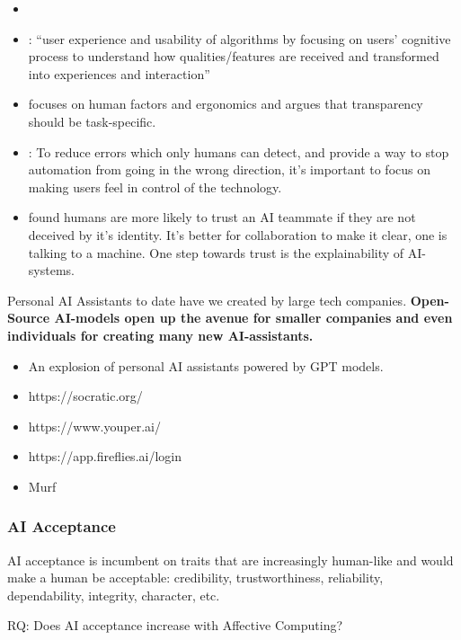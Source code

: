 \documentclass[
  letterpaper,
  DIV=11,
  numbers=noendperiod]{scrartcl}
\providecommand{\tightlist}{%
  \setlength{\itemsep}{0pt}\setlength{\parskip}{0pt}}\usepackage{longtable,booktabs,array}
\begin{document}
\begin{itemize}
\item
  \citet{slackAturaProcess2021}
\item
  \citet{shinHowUsersInteract2020}: ``user experience and usability of
  algorithms by focusing on users' cognitive process to understand how
  qualities/features are received and transformed into experiences and
  interaction''
\item
  \citet{zerilliHowTransparencyModulates2022} focuses on human factors
  and ergonomics and argues that transparency should be task-specific.
\item
  \citet{holbrookHumanCenteredMachineLearning2018}: To reduce errors
  which only humans can detect, and provide a way to stop automation
  from going in the wrong direction, it's important to focus on making
  users feel in control of the technology.
\item
  \citet{ZHANG2023107536} found humans are more likely to trust an AI
  teammate if they are not deceived by it's identity. It's better for
  collaboration to make it clear, one is talking to a machine. One step
  towards trust is the explainability of AI-systems.
\end{itemize}

Personal AI Assistants to date have we created by large tech companies.
\textbf{Open-Source AI-models open up the avenue for smaller companies
and even individuals for creating many new AI-assistants.}

\begin{itemize}
\tightlist
\item
  An explosion of personal AI assistants powered by GPT models.
\item
  https://socratic.org/
\item
  https://www.youper.ai/
\item
  https://app.fireflies.ai/login
\item
  Murf
\end{itemize}

\subsubsection{AI Acceptance}\label{ai-acceptance}

AI acceptance is incumbent on traits that are increasingly human-like
and would make a human be acceptable: credibility, trustworthiness,
reliability, dependability, integrity, character, etc.

RQ: Does AI acceptance increase with Affective Computing?
\end{document}

